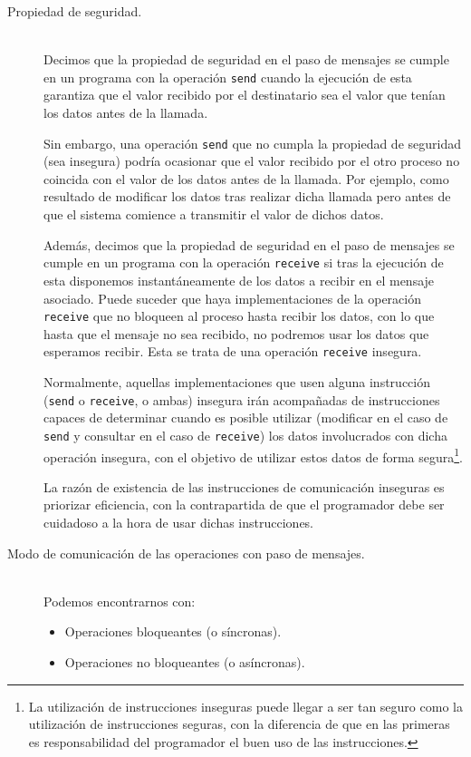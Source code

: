 \begin{description}
    \item [Propiedad de seguridad.]~\\
        Decimos que la propiedad de seguridad en el paso de mensajes se cumple en un programa con la operación \verb|send| cuando la ejecución de esta garantiza que el valor recibido por el destinatario sea el valor que tenían los datos antes de la llamada.

        Sin embargo, una operación \verb|send| que no cumpla la propiedad de seguridad (sea insegura) podría ocasionar que el valor recibido por el otro proceso no coincida con el valor de los datos antes de la llamada. Por ejemplo, como resultado de modificar los datos tras realizar dicha llamada pero antes de que el sistema comience a transmitir el valor de dichos datos.

        Además, decimos que la propiedad de seguridad en el paso de mensajes se cumple en un programa con la operación \verb|receive| si tras la ejecución de esta disponemos instantáneamente de los datos a recibir en el mensaje asociado. Puede suceder que haya implementaciones de la operación \verb|receive| que no bloqueen al proceso hasta recibir los datos, con lo que hasta que el mensaje no sea recibido, no podremos usar los datos que esperamos recibir. Esta se trata de una operación \verb|receive| insegura.

        Normalmente, aquellas implementaciones que usen alguna instrucción (\verb|send| o \verb|receive|, o ambas) insegura irán acompañadas de instrucciones capaces de determinar cuando es posible utilizar (modificar en el caso de \verb|send| y consultar en el caso de \verb|receive|) los datos involucrados con dicha operación insegura, con el objetivo de utilizar estos datos de forma segura\footnote{La utilización de instrucciones inseguras puede llegar a ser tan seguro como la utilización de instrucciones seguras, con la diferencia de que en las primeras es responsabilidad del programador el buen uso de las instrucciones.}.

        La razón de existencia de las instrucciones de comunicación inseguras es priorizar eficiencia, con la contrapartida de que el programador debe ser cuidadoso a la hora de usar dichas instrucciones.
    \item [Modo de comunicación de las operaciones con paso de mensajes.]~\\
        Podemos encontrarnos con:
        \begin{itemize}
            \item Operaciones bloqueantes (o síncronas).
            \item Operaciones no bloqueantes (o asíncronas).
        \end{itemize}
\end{description}

